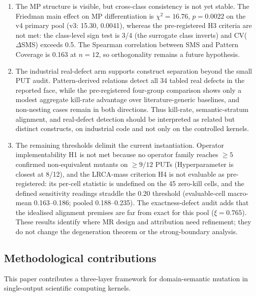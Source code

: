 \documentclass[manuscript,screen,review]{acmart}
\begin{document}
\begin{enumerate}
  class-d mean SMS by 38.3\%.
\item
  The MP structure is visible, but cross-class consistency is not yet
  stable. The Friedman main effect on MP differentiation is
  \(\chi^2 = 16.76\), \(p = 0.0022\) on the v4 primary pool (v3:
  15.30, 0.0041), whereas the pre-registered H3
  criteria are not met: the class-level sign test is 3/4 (the surrogate
  class inverts) and
  CV(\(\Delta\)SMS) exceeds 0.5. The Spearman correlation between SMS
  and Pattern Coverage is 0.163 at \(n = 12\), so orthogonality remains
  a future hypothesis.
\item
  The industrial real-defect arm supports construct separation beyond
  the small PUT audit. Pattern-derived relations detect all 34 tabled
  real defects
  in the reported face, while the pre-registered four-group comparison
  shows only a modest aggregate kill-rate advantage
  over literature-generic baselines, and non-nesting
  cases remain in both directions. Thus kill-rate, semantic-stratum
  alignment, and
  real-defect detection should be interpreted as related but distinct
  constructs, on industrial code and not only on the controlled kernels.
\item
  The remaining thresholds delimit the current instantiation. Operator
  implementability H1 is not met because no operator family reaches
  \(\geq 5\) confirmed non-equivalent mutants on \(\geq 9/12\) PUTs
  (Hyperparameter is closest at 8/12), and the LRCA-mass criterion H4 is
  not evaluable as pre-registered: its per-cell statistic is undefined
  on the 45 zero-kill cells, and the defined sensitivity readings
  straddle the 0.20 threshold (evaluable-cell macro-mean 0.163--0.186;
  pooled 0.188--0.235). The exactness-defect audit adds that the
  idealised alignment premises are far from exact for this pool
  ($\xi = 0.765$). These
  results identify where MR design and attribution need refinement; they
  do not change the degeneration theorem or the strong-boundary
  analysis.
\end{enumerate}

\subsection{Methodological contributions}\label{methodological-contributions}

This paper contributes a three-layer framework for domain-semantic
mutation in single-output scientific computing kernels.
\end{document}
